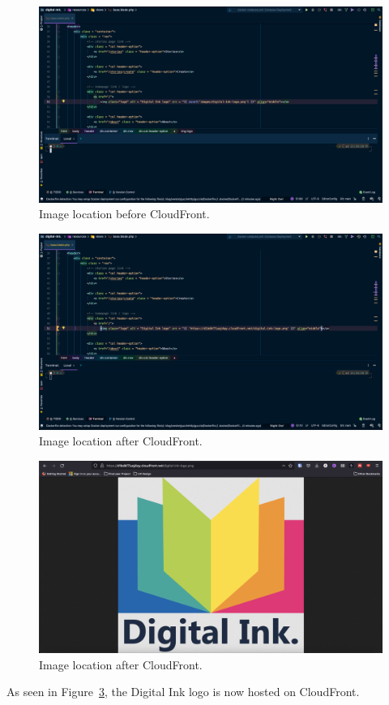 \begin{figure}[!htbp]
    \centering
    \includegraphics[width=\textwidth]{resources/cloudfront/cloudfront-before}
    \caption{Image location before CloudFront.}
    \label{fig:cloudfront-before}
\end{figure}

\begin{figure}[!htbp]
    \centering
    \includegraphics[width=\textwidth]{resources/cloudfront/cloudfront-after}
    \caption{Image location after CloudFront.}
    \label{fig:cloudfront-after}
\end{figure}

\clearpage

\begin{figure}[!htbp]
    \centering
    \includegraphics[width=\textwidth]{resources/cloudfront/cloudfront-website}
    \caption{Image location after CloudFront.}
    \label{fig:cloudfront-website}
\end{figure}

As seen in Figure~\ref{fig:cloudfront-website}, the Digital Ink logo is now hosted on CloudFront.





